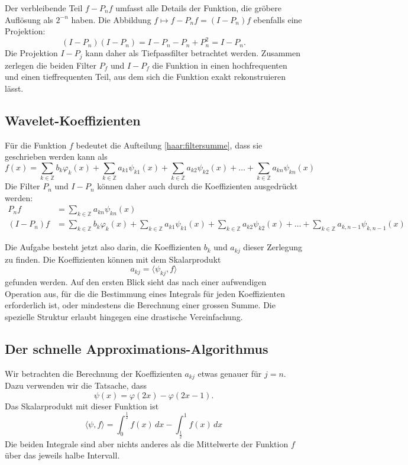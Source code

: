 Der verbleibende Teil $f-P_nf$ umfasst alle Details der Funktion, die
gröbere Auflösung als $2^{-n}$ haben.
Die Abbildung $f\mapsto f-P_nf = (I-P_n)f$ ebenfalls eine Projektion:
\[
(I-P_n)(I-P_n) = I -P_n - P_n + P_n^2 = I - P_n.
\]
Die Projektion $I-P_j$ kann daher als Tiefpassfilter betrachtet werden.
Zusammen zerlegen die beiden Filter $P_f$ und $I-P_f$ die Funktion
in einen hochfrequenten und einen tieffrequenten Teil, aus dem sich
die Funktion exakt rekonstruieren lässt.

\subsection{Wavelet-Koeffizienten}
Für die Funktion $f$ bedeutet die Aufteilung \eqref{haar:filtersumme},
dass sie geschrieben werden kann als
\[
f(x)
=
\sum_{k\in\mathbb Z} b_k\varphi_k(x)
+
\sum_{k\in\mathbb Z} a_{k1}\psi_{k1}(x)
+
\sum_{k\in\mathbb Z} a_{k2}\psi_{k2}(x)
+
\dots
+
\sum_{k\in\mathbb Z} a_{kn}\psi_{kn}(x)
\]
Die Filter $P_n$ und $I-P_n$ können daher auch durch die Koeffizienten
ausgedrückt werden:
\begin{align*}
P_nf 
&=
\sum_{k\in\mathbb Z} a_{kn}\psi_{kn}(x)
\\
(I-P_n)f
&=
\sum_{k\in\mathbb Z} b_k\varphi_k(x)
+
\sum_{k\in\mathbb Z} a_{k1}\psi_{k1}(x)
+
\sum_{k\in\mathbb Z} a_{k2}\psi_{k2}(x)
+
\dots
+
\sum_{k\in\mathbb Z} a_{k,n-1}\psi_{k,n-1}(x)
\end{align*}

Die Aufgabe besteht jetzt also darin, die Koeffizienten $b_k$ und
$a_{kj}$ dieser Zerlegung zu finden.
Die Koeffizienten können mit dem Skalarprodukt
\[
a_{kj} = \langle \psi_{kj}, f\rangle
\]
gefunden werden.
Auf den ersten Blick sieht das nach einer aufwendigen Operation
aus, für die die Bestimmung eines Integrals für jeden Koeffizienten
erforderlich ist, oder mindestens die Berechnung einer grossen Summe.
Die spezielle Struktur erlaubt hingegen eine drastische Vereinfachung.


\subsection{Der schnelle Approximations-Algorithmus}
Wir betrachten die Berechnung der Koeffizienten $a_{kj}$ etwas genauer für
$j=n$.
Dazu verwenden wir die Tatsache, dass 
\[
\psi(x) = \varphi(2x) - \varphi(2x-1).
\]
Das Skalarprodukt mit dieser Funktion ist
\[
\langle \psi,f\rangle
=
\int_0^{\frac12} f(x)\,dx - \int_{\frac12}^1 f(x)\,dx
\]
Die beiden Integrale sind aber nichts anderes als die Mittelwerte
der Funktion $f$ über das jeweils halbe Intervall.

